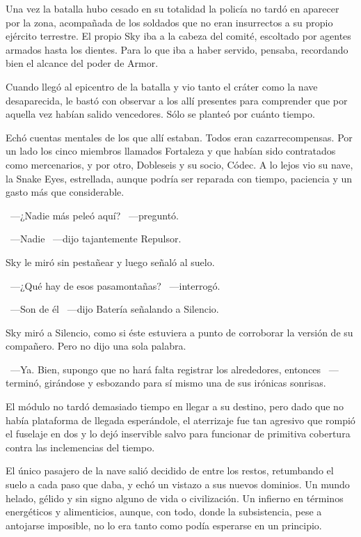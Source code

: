Una vez la batalla hubo cesado en su totalidad la policía no tardó en aparecer por la zona, acompañada de los soldados que no eran insurrectos a su propio ejército terrestre. El propio Sky iba a la cabeza del comité, escoltado por agentes armados hasta los dientes. Para lo que iba a haber servido, pensaba, recordando bien el alcance del poder de Armor.

Cuando llegó al epicentro de la batalla y vio tanto el cráter como la nave desaparecida, le bastó con observar a los allí presentes para comprender que por aquella vez habían salido vencedores. Sólo se planteó por cuánto tiempo.

Echó cuentas mentales de los que allí estaban. Todos eran cazarrecompensas. Por un lado los cinco miembros llamados Fortaleza y que habían sido contratados como mercenarios, y por otro, Dobleseis y su socio, Códec. A lo lejos vio su nave, la Snake Eyes, estrellada, aunque podría ser reparada con tiempo, paciencia y un gasto más que considerable.

~---¿Nadie más peleó aquí? ~---preguntó.

~---Nadie ~---dijo tajantemente Repulsor.

Sky le miró sin pestañear y luego señaló al suelo.

~---¿Qué hay de esos pasamontañas? ~---interrogó.

~---Son de él ~---dijo Batería señalando a Silencio.

Sky miró a Silencio, como si éste estuviera a punto de corroborar la versión de su compañero. Pero no dijo una sola palabra.

~---Ya. Bien, supongo que no hará falta registrar los alrededores, entonces ~---terminó, girándose y esbozando para sí mismo una de sus irónicas sonrisas.

\parbreak
El módulo no tardó demasiado tiempo en llegar a su destino, pero dado que no había plataforma de llegada esperándole, el aterrizaje fue tan agresivo que rompió el fuselaje en dos y lo dejó inservible salvo para funcionar de primitiva cobertura contra las inclemencias del tiempo.

El único pasajero de la nave salió decidido de entre los restos, retumbando el suelo a cada paso que daba, y echó un vistazo a sus nuevos dominios. Un mundo helado, gélido y sin signo alguno de vida o civilización. Un infierno en términos energéticos y alimenticios, aunque, con todo, donde la subsistencia, pese a antojarse imposible, no lo era tanto como podía esperarse en un principio.

